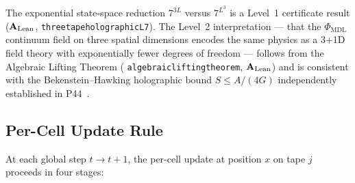 \documentclass[11pt]{article}
\theoremstyle{remark}
\newcommand{\PHIMDL}{\Phi_{\mathrm{MDL}}}
\newcommand{\lean}[1]{%
  \penalty-100
  \begingroup\def\_{\textunderscore\allowbreak}\texttt{#1}\endgroup}
\newcommand{\CatAL}{\ensuremath{\textbf{A}_{\rm Lean}}}
\begin{document}
The exponential state-space reduction $7^{3L}$ versus $7^{L^3}$ is a Level~1
certificate result ($\CatAL$, \lean{three\_tape\_holographic\_L7}).  The Level~2
interpretation --- that the $\PHIMDL$ continuum field on three spatial dimensions
encodes the same physics as a 3+1D field theory with exponentially fewer degrees of
freedom --- follows from the Algebraic Lifting Theorem
(\lean{algebraic\_lifting\_theorem}, \CatAL) and is consistent with the
Bekenstein--Hawking holographic bound $S\leq A/(4G)$ independently established in
P44~\cite{SpivackQGR}.

\subsection{Per-Cell Update Rule}

At each global step $t \to t+1$, the per-cell update at position $x$ on tape $j$
proceeds in four stages:
\end{document}
